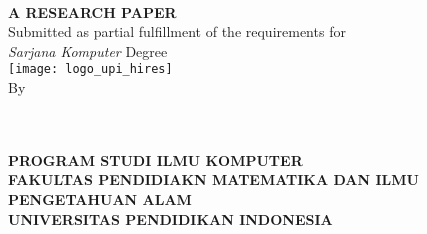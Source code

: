 \begin{titlepage}
    \begin{center}

        \begin{doublespace}
            \textbf{\MakeUppercase{\judul}}\\[1cm]
        \end{doublespace}
        \textbf{\MakeUppercase{A Research Paper}}\\[1cm]
        Submitted as partial fulfillment of the requirements for\\
        \textit{Sarjana Komputer} Degree\\[1cm]

        \texttt{[image: logo\_upi\_hires]}\\[1cm]
        By\\
        \penulis\\
        \nim\\
        \vfill

        \textbf{\MakeUppercase{program studi ilmu komputer}}\\
        \textbf{ \MakeUppercase{fakultas pendidiakn matematika dan ilmu pengetahuan alam}}\\
        \textbf{\MakeUppercase{UNIVERSITAS PENDIDIKAN INDONESIA}}\\
        \textbf{\the\year{}}\\
    \end{center}
\end{titlepage}
